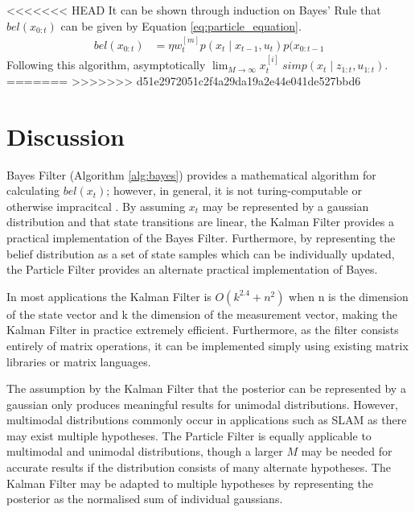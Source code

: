 \documentclass[english]{article}
\begin{document}
<<<<<<< HEAD
It can be shown through induction on Bayes' Rule that $bel(x_{0:t})$ can be given by Equation \ref{eq:particle_equation}.
\begin{align}
  bel(x_{0:t}) & = \eta w^{[m]}_tp(x_t \mid x_{t-1}, u_t)p(x_{0:t-1}
\end{align}
Following this algorithm, asymptotically $\lim_{M \to \infty} x^{[i]}_t \ sim p(x_t \mid z_{1:t}, u_{1:t})$.
=======
>>>>>>> d51e2972051c2f4a29da19a2e44e041de527bbd6



\section*{Discussion}

Bayes Filter (Algorithm \ref{alg:bayes}) provides a mathematical algorithm for calculating $bel(x_t)$; however, in general, it is not turing-computable or otherwise impracitcal \cite{probrob}. By assuming $x_t$ may be represented by a gaussian distribution and that state transitions are linear, the Kalman Filter provides a practical implementation of the Bayes Filter. Furthermore, by representing the belief distribution as a set of state samples which can be individually updated, the Particle Filter provides an alternate practical implementation of Bayes.

In most applications the Kalman Filter is $O(k^{2.4} + n^2)$ when n is the dimension of the state vector and k the dimension of the measurement vector\cite{probrob}, making the Kalman Filter in practice extremely efficient. Furthermore, as the filter consists entirely of matrix operations, it can be implemented simply using existing matrix libraries or matrix languages.

The assumption by the Kalman Filter that the posterior can be represented by a gaussian only produces meaningful results for unimodal distributions. However, multimodal distributions commonly occur in applications such as SLAM as there may exist multiple hypotheses. The Particle Filter is equally applicable to multimodal and unimodal distributions, though a larger $M$ may be needed for accurate results if the distribution consists of many alternate hypotheses. The Kalman Filter may be adapted to multiple hypotheses by representing the posterior as the normalised sum of individual gaussians.
\end{document}
